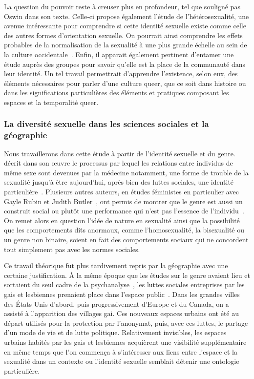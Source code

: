 La question du pouvoir reste à creuser plus en profondeur, tel que souligné pas Oswin dans son texte. 
Celle-ci propose également l'étude de l'hétérosexualité, une avenue intéressante pour comprendre si cette identité sexuelle existe comme celle des autres formes d'orientation sexuelle. 
On pourrait ainsi comprendre les effets probables de la normalisation de la sexualité à une plus grande échelle au sein de la culture occidentale~\citep[100]{Oswin2008}. 
Enfin, il apparait également pertinent d’entamer une étude auprès des groupes \lgbt{} pour savoir qu'elle est la place de la communauté dans leur identité. 
Un tel travail permettrait d'apprendre l'existence, selon eux, des éléments nécessaires pour parler d'une culture queer, que ce soit dans histoire ou dans les significations particulières des éléments et pratiques composant les espaces et la temporalité queer.

\subsubsection{La diversité sexuelle dans les sciences sociales et la géographie}
\label{ssub:la_diversit_sexuelle_dans_les_sciences_sociales_et_la_g_ographie}
Nous travaillerons dans cette étude à partir de l'identité sexuelle et du genre.
\citet{Foucault2011} décrit dans son œuvre  le processus par lequel les relations entre individus de même sexe sont devenues par la médecine notamment, une forme de trouble de la sexualité jusqu'à être aujourd'hui, après bien des luttes sociales, une identité particulière~\citep{Foucault2011}. 
Plusieurs autres auteurs, en études féministes en particulier avec Gayle Rubin et Judith Butler~\citep[98]{Marcus2005}, ont permis de montrer que le genre est aussi un construit social ou plutôt une performance qui n'est pas l'essence de l'individu~\citep{Butler2007}. 
On remet alors en question l'idée de nature en sexualité ainsi que la possibilité que les comportements dits anormaux, comme l'homosexualité, la bisexualité ou un genre non binaire, soient en fait des comportements sociaux qui ne concordent tout simplement pas avec les normes sociales.

Ce travail théorique fut plus tardivement repris par la géographie avec une certaine justification. 
À la même époque que les études sur le genre avaient lieu et sortaient du seul cadre de la psychanalyse~\citep{Rubin2011a,Rubin2011}, les luttes sociales entreprises par les gais et lesbiennes prenaient place dans l'espace public~\citep[422-427]{Spencer2005}. 
Dans les grandes villes des États-Unis d'abord, puis progressivement d'Europe et du Canada, on a assisté à l'apparition des villages gai. 
Ces nouveaux espaces urbains ont été au départ utilisés pour la protection par l'anonymat, puis, avec ces luttes, le partage d'un mode de vie et de lutte politique. 
Relativement invisibles, les espaces urbains habités par les gais et lesbiennes acquièrent une visibilité supplémentaire en même temps que l'on commença à s'intéresser aux liens entre l'espace et la sexualité dans un contexte ou l'identité sexuelle semblait détenir une ontologie particulière.

